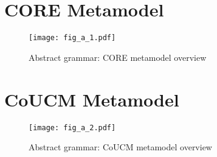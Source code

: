 \section{CORE Metamodel}

\begin{figure}[h]
	\centering
	\texttt{[image: fig\_a\_1.pdf]}
	\caption{Abstract grammar: CORE metamodel overview}
	\label{fig:a.1}
\end{figure}

\section{CoUCM Metamodel}

\begin{figure}[h]
	\centering
	\texttt{[image: fig\_a\_2.pdf]}
	\caption{Abstract grammar: CoUCM metamodel overview}
	\label{fig:a.2}
\end{figure}
